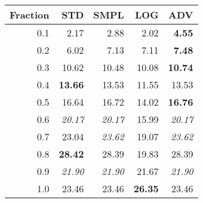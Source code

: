 \documentclass{standalone}
\begin{document}
\begin{tabular}{r|rrrr}
      \toprule
      Fraction & STD & SMPL & LOG & ADV\\
      \midrule
      0.1 & 2.17 & 2.88 & 2.02 & \textbf{4.55}\\
  0.2 & 6.02 & 7.13 & 7.11 & \textbf{7.48}\\
  0.3 & 10.62 & 10.48 & 10.08 & \textbf{10.74}\\
  0.4 & \textbf{13.66} & 13.53 & 11.55 & 13.53\\
  0.5 & 16.64 & 16.72 & 14.02 & \textbf{16.76}\\
  0.6 & \emph{20.17} & \emph{20.17} & 15.99 & \emph{20.17}\\
  0.7 & 23.04 & \emph{23.62} & 19.07 & \emph{23.62}\\
  0.8 & \textbf{28.42} & 28.39 & 19.83 & 28.39\\
  0.9 & \emph{21.90} & \emph{21.90} & 21.67 & \emph{21.90}\\
  1.0 & 23.46 & 23.46 & \textbf{26.35} & 23.46\\
  \bottomrule
\end{tabular}
\end{document}

